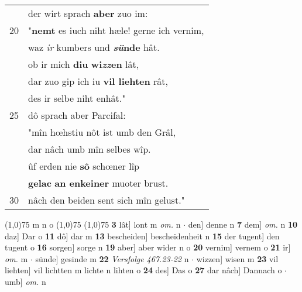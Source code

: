 \documentclass[8pt,a4paper,notitlepage]{article}
\begin{document}
\begin{table}[ht]
\begin{minipage}[t]{0.5\linewidth}
\begin{tabular}{rl}
 & der wirt sprach \textbf{aber} zuo im:\\ 
20 & "\textbf{nemt} es iuch niht hæle! gerne ich vernim,\\ 
 & waz \textit{ir} kumbers und \textbf{\textit{sü}nde} hât.\\ 
 & ob ir mich \textbf{diu} \textbf{wi\textit{zz}en} lât,\\ 
 & dar zuo gip ich iu \textbf{vil liehten} rât,\\ 
 & des ir selbe niht enhât."\\ 
25 & dô sprach aber Parcifal:\\ 
 & "mîn hœhstiu nôt ist umb den Grâl,\\ 
 & dar nâch umb mîn selbes wîp.\\ 
 & ûf erden nie \textbf{sô} schœner lîp\\ 
 & \textbf{gelac} \textbf{an enkeiner} muoter brust.\\ 
30 & nâch den beiden sent sich mîn gelust."\\ 
\end{tabular}
\scriptsize
\line(1,0){75} \newline
m n o \newline
\line(1,0){75} \newline
\newline
\line(1,0){75} \newline
\textbf{3} lât] lont m \textit{om.} n  $\cdot$ den] denne n \textbf{7} dem] \textit{om.} n \textbf{10} daz] Dar o \textbf{11} dô] dar m \textbf{13} bescheiden] bescheidenheit n \textbf{15} der tugent] den tugent o \textbf{16} sorgen] sorge n \textbf{19} aber] aber wider n o \textbf{20} vernim] vernem o \textbf{21} ir] \textit{om.} m  $\cdot$ sünde] gesinde m \textbf{22} \textit{Versfolge 467.23-22} n   $\cdot$ wizzen] wisen m \textbf{23} vil liehten] vil lichtten m lichte n lihten o \textbf{24} des] Das o \textbf{27} dar nâch] Dannach o  $\cdot$ umb] \textit{om.} n \newline
\end{minipage}
\end{table}
\newpage
\end{document}
